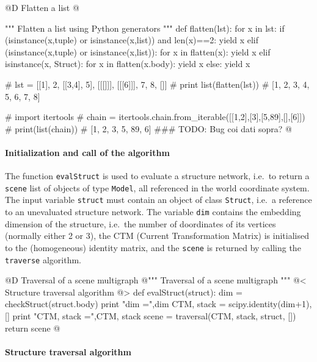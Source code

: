 \documentclass[11pt,oneside]{article}    %
\begin{document}
@D Flatten a list
@{""" Flatten a list using Python generators """
def flatten(lst):
    for x in lst:
        if (isinstance(x,tuple) or isinstance(x,list)) and len(x)==2:
            yield x
        elif (isinstance(x,tuple) or isinstance(x,list)):
            for x in flatten(x):
                yield x
        elif isinstance(x, Struct):
            for x in flatten(x.body):
                yield x
        else:
            yield x
 
#  lst = [[1], 2, [[3,4], 5], [[[]]], [[[6]]], 7, 8, []]
#  print list(flatten(lst)) 
#  [1, 2, 3, 4, 5, 6, 7, 8]

#  import itertools
#  chain = itertools.chain.from_iterable([[1,2],[3],[5,89],[],[6]])
#  print(list(chain))
#  [1, 2, 3, 5, 89, 6]    ###  TODO: Bug coi dati sopra?
@}

\paragraph{Initialization and call of the algorithm}

The function \texttt{evalStruct} is used to evaluate a structure network, i.e.~to return a \texttt{scene}
list of objects of type \texttt{Model}, all referenced in the world coordinate system. The input variable \texttt{struct} must contain an object of class \texttt{Struct}, i.e.~a reference to an unevaluated structure network. The variable \texttt{dim}  contains the embedding dimension of the structure, i.e.~the number of doordinates of its vertices (normally either 2 or 3), the CTM (Current Transformation Matrix) is initialised to the (homogeneous) identity matrix, and  the \texttt{scene} is returned by calling the \texttt{traverse} algorithm.

@D Traversal of a scene multigraph
@{""" Traversal of a scene multigraph """
@< Structure traversal algorithm @>
def evalStruct(struct):
    dim = checkStruct(struct.body)
    print "\n dim =",dim
    CTM, stack = scipy.identity(dim+1), []
    print "\n CTM, stack =",CTM, stack
    scene = traversal(CTM, stack, struct, []) 
    return scene
@}

\paragraph{Structure traversal algorithm}
\end{document}
